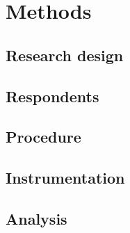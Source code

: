 \chapter{Methods}
\label{ch:methods}

\section{Research design}
\label{sec:researchdesign}

\section{Respondents}
\label{sec:respondents}

\section{Procedure}
\label{sec:procedure}

\section{Instrumentation}
\label{sec:instrumentation}

\section{Analysis}
\label{sec:analysis}
